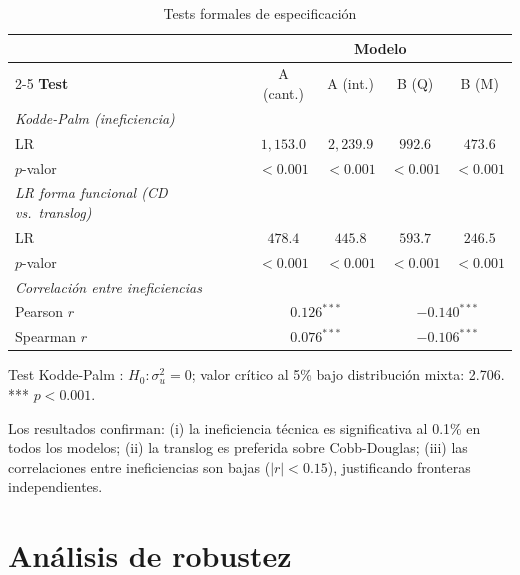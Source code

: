 \documentclass[12pt, a4paper, twoside, openright]{book}
\theoremstyle{plain}
\theoremstyle{definition}
\theoremstyle{remark}
\begin{document}
\begin{table}[htbp]
\centering
\caption{Tests formales de especificación}
\label{tab:tests_spec}
\begin{threeparttable}
\begin{tabular}{lcccc}
\toprule
& \multicolumn{4}{c}{\textbf{Modelo}} \\
\cmidrule{2-5}
\textbf{Test} & A (cant.) & A (int.) & B (Q) & B (M) \\
\midrule
\textit{Kodde-Palm (ineficiencia)} \\
\quad LR & $1{,}153.0$ & $2{,}239.9$ & $992.6$ & $473.6$ \\
\quad $p$-valor & $<0.001$ & $<0.001$ & $<0.001$ & $<0.001$ \\[4pt]
\textit{LR forma funcional (CD vs.\ translog)} \\
\quad LR & $478.4$ & $445.8$ & $593.7$ & $246.5$ \\
\quad $p$-valor & $<0.001$ & $<0.001$ & $<0.001$ & $<0.001$ \\[4pt]
\textit{Correlación entre ineficiencias} \\
\quad Pearson $r$ & \multicolumn{2}{c}{$0.126^{***}$}
  & \multicolumn{2}{c}{$-0.140^{***}$} \\
\quad Spearman $r$ & \multicolumn{2}{c}{$0.076^{***}$}
  & \multicolumn{2}{c}{$-0.106^{***}$} \\
\bottomrule
\end{tabular}
\begin{tablenotes}
  \small
  \item Test Kodde-Palm \citep{kodde1986}: $H_0: \sigma^2_u = 0$; valor crítico al 5\% bajo distribución mixta: 2.706. *** $p<0.001$.
\end{tablenotes}
\end{threeparttable}
\end{table}

Los resultados confirman: (i) la ineficiencia técnica es significativa al 0.1\% en todos los modelos; (ii) la translog es preferida sobre Cobb-Douglas; (iii) las correlaciones entre ineficiencias son bajas ($|r|<0.15$), justificando fronteras independientes.

\section{Análisis de robustez}
\end{document}
